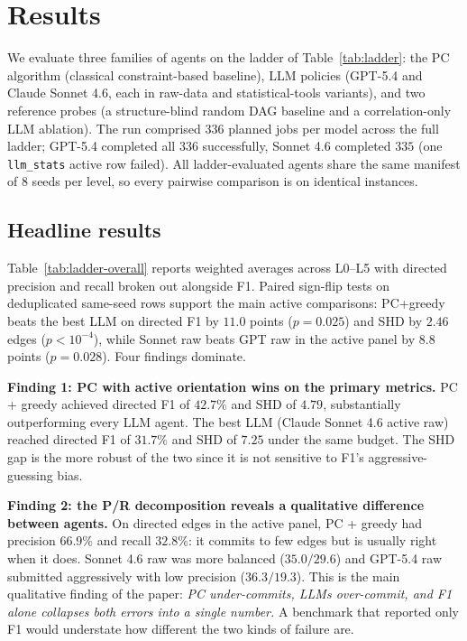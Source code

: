 \section{Results}
\label{sec:results}

We evaluate three families of agents on the ladder of Table~\ref{tab:ladder}: the PC algorithm (classical constraint-based baseline), LLM policies (GPT-5.4 and Claude Sonnet 4.6, each in raw-data and statistical-tools variants), and two reference probes (a structure-blind random DAG baseline and a correlation-only LLM ablation). The run comprised $336$ planned jobs per model across the full ladder; GPT-5.4 completed all $336$ successfully, Sonnet 4.6 completed $335$ (one \texttt{llm\_stats} active row failed). All ladder-evaluated agents share the same manifest of $8$ seeds per level, so every pairwise comparison is on identical instances.

\subsection{Headline results}

Table~\ref{tab:ladder-overall} reports weighted averages across L0--L5 with directed precision and recall broken out alongside F1. Paired sign-flip tests on deduplicated same-seed rows support the main active comparisons: PC+greedy beats the best LLM on directed F1 by $11.0$ points ($p=0.025$) and SHD by $2.46$ edges ($p<10^{-4}$), while Sonnet raw beats GPT raw in the active panel by $8.8$ points ($p=0.028$). Four findings dominate.



\textbf{Finding 1: PC with active orientation wins on the primary metrics.} PC + greedy achieved directed F1 of $42.7\%$ and SHD of $4.79$, substantially outperforming every LLM agent. The best LLM (Claude Sonnet 4.6 active raw) reached directed F1 of $31.7\%$ and SHD of $7.25$ under the same budget. The SHD gap is the more robust of the two since it is not sensitive to F1's aggressive-guessing bias.

\textbf{Finding 2: the P/R decomposition reveals a qualitative difference between agents.} On directed edges in the active panel, PC + greedy had precision $66.9\%$ and recall $32.8\%$: it commits to few edges but is usually right when it does. Sonnet 4.6 raw was more balanced ($35.0/29.6$) and GPT-5.4 raw submitted aggressively with low precision ($36.3/19.3$). This is the main qualitative finding of the paper: \emph{PC under-commits, LLMs over-commit, and F1 alone collapses both errors into a single number.} A benchmark that reported only F1 would understate how different the two kinds of failure are.

